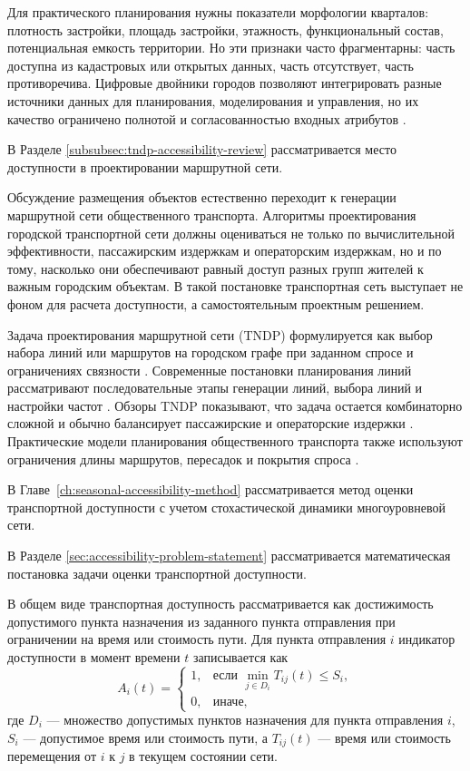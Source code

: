 Для практического планирования нужны показатели морфологии кварталов: плотность застройки, площадь застройки, этажность, функциональный состав, потенциальная емкость территории. Но эти признаки часто фрагментарны: часть доступна из кадастровых или открытых данных, часть отсутствует, часть противоречива. Цифровые двойники городов позволяют интегрировать разные источники данных для планирования, моделирования и управления, но их качество ограничено полнотой и согласованностью входных атрибутов \cite{batty2018digitalTwin}.

В Разделе \ref{subsubsec:tndp-accessibility-review} рассматривается место доступности в проектировании маршрутной сети.

Обсуждение размещения объектов естественно переходит к генерации маршрутной сети общественного транспорта. Алгоритмы проектирования городской транспортной сети должны оцениваться не только по вычислительной эффективности, пассажирским издержкам и операторским издержкам, но и по тому, насколько они обеспечивают равный доступ разных групп жителей к важным городским объектам. В такой постановке транспортная сеть выступает не фоном для расчета доступности, а самостоятельным проектным решением.

Задача проектирования маршрутной сети (TNDP) формулируется как выбор набора линий или маршрутов на городском графе при заданном спросе и ограничениях связности \cite{mandl1980tndp}. Современные постановки планирования линий рассматривают последовательные этапы генерации линий, выбора линий и настройки частот \cite{schmidt2024linePlanning}. Обзоры TNDP показывают, что задача остается комбинаторно сложной и обычно балансирует пассажирские и операторские издержки \cite{duranMicco2022tndpReview}. Практические модели планирования общественного транспорта также используют ограничения длины маршрутов, пересадок и покрытия спроса \cite{sahin2023linePlanning}.






В Главе~\ref{ch:seasonal-accessibility-method} рассматривается метод оценки транспортной доступности с учетом стохастической динамики многоуровневой сети.

В Разделе \ref{sec:accessibility-problem-statement} рассматривается математическая постановка задачи оценки транспортной доступности.

В общем виде транспортная доступность рассматривается как достижимость допустимого пункта назначения из заданного пункта отправления при ограничении на время или стоимость пути. Для пункта отправления \(i\) индикатор доступности в момент времени \(t\) записывается как
\[
A_i(t)=
\begin{cases}
1, & \text{если } \min\limits_{j\in D_i} T_{ij}(t)\le S_i,\\
0, & \text{иначе},
\end{cases}
\]
где \(D_i\) --- множество допустимых пунктов назначения для пункта отправления \(i\), \(S_i\) --- допустимое время или стоимость пути, а \(T_{ij}(t)\) --- время или стоимость перемещения от \(i\) к \(j\) в текущем состоянии сети.

